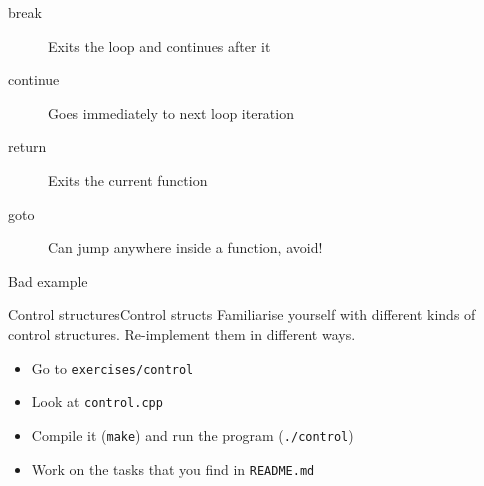 \begin{frame}[fragile]
  \begin{block}{}
    \begin{description}
    \item[break] Exits the loop and continues after it
    \item[continue] Goes immediately to next loop iteration
    \item[return] Exits the current function
    \item[goto] Can jump anywhere inside a function, avoid!
    \end{description}
  \end{block}
  \pause
  \begin{alertblock}{Bad example}
  \end{alertblock}
\end{frame}

\begin{frame}[fragile]
  \begin{exerciseWithShortcut}{Control structures}{Control structs}
    Familiarise yourself with different kinds of control structures. Re-implement them in different ways.
    \begin{itemize}
      \item Go to \texttt{exercises/control}
      \item Look at \texttt{control.cpp}
      \item Compile it (\texttt{make}) and run the program (\texttt{./control})
      \item Work on the tasks that you find in \texttt{README.md}
    \end{itemize}
  \end{exerciseWithShortcut}
\end{frame}
